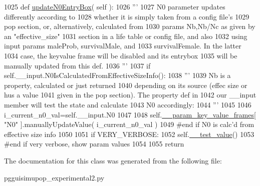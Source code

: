 \begin{DoxyCode}
1025     \textcolor{keyword}{def }\hyperlink{classnegui_1_1pgguisimupop__experimental2_1_1PGGuiSimuPop_ac06966a637e67a0e40721510eb36c353}{updateN0EntryBox}( self ):
1026         \textcolor{stringliteral}{'''}
1027 \textcolor{stringliteral}{        N0 parameter updates differently according to}
1028 \textcolor{stringliteral}{        whether it is simply taken from a config file's}
1029 \textcolor{stringliteral}{        pop section, or, alternatively, calculated from}
1030 \textcolor{stringliteral}{        params Nb,Nb/Nc as given by an "effective\_size"}
1031 \textcolor{stringliteral}{        section in a life table or config file, and also}
1032 \textcolor{stringliteral}{        using input params maleProb, survivalMale, and}
1033 \textcolor{stringliteral}{        survivalFemale.  In the latter}
1034 \textcolor{stringliteral}{        case, the keyvalue frame will be disabled and its entrybox}
1035 \textcolor{stringliteral}{        will be manually updated from this def.  }
1036 \textcolor{stringliteral}{        '''}
1037         \textcolor{keywordflow}{if} self.\_\_input.N0IsCalculatedFromEffectiveSizeInfo():
1038             \textcolor{stringliteral}{'''}
1039 \textcolor{stringliteral}{            Nb is a property, calculated or just returned}
1040 \textcolor{stringliteral}{            depending on its source (effec size or hus a value}
1041 \textcolor{stringliteral}{            given in the pop section). The property def in}
1042 \textcolor{stringliteral}{            our \_\_input member will test the state and calculate}
1043 \textcolor{stringliteral}{            N0 accordingly:}
1044 \textcolor{stringliteral}{            '''}
1045 
1046             i\_current\_n0\_val=self.\_\_input.N0
1047 
1048             self.\hyperlink{classnegui_1_1pgguisimupop__experimental2_1_1PGGuiSimuPop_a08bb009e9a24284adfbd8a38dcc0c861}{\_\_param\_key\_value\_frames}[ \textcolor{stringliteral}{"N0"} ].manuallyUpdateValue( 
      i\_current\_n0\_val )
1049         \textcolor{comment}{#end if N0 is calc'd from effective size info}
1050 
1051         \textcolor{keywordflow}{if} VERY\_VERBOSE:
1052             self.\hyperlink{classnegui_1_1pgguisimupop__experimental2_1_1PGGuiSimuPop_ac4cb6da9c083f9e2dfaa242d7033ef0f}{\_\_test\_value}()
1053         \textcolor{comment}{#end if very verbose, show param values}
1054 
1055         \textcolor{keywordflow}{return}
\end{DoxyCode}


The documentation for this class was generated from the following file\+:\begin{DoxyCompactItemize}
\item 
pgguisimupop\+\_\+experimental2.\+py\end{DoxyCompactItemize}
